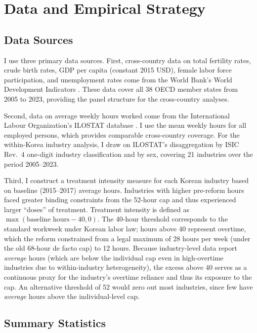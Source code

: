 \documentclass[12pt]{article}
\begin{document}
\section{Data and Empirical Strategy}

\subsection{Data Sources}

I use three primary data sources. First, cross-country data on total fertility rates, crude birth rates, GDP per capita (constant 2015 USD), female labor force participation, and unemployment rates come from the World Bank's World Development Indicators \citep{worldbank2024wdi}. These data cover all 38 OECD member states from 2005 to 2023, providing the panel structure for the cross-country analyses.

Second, data on average weekly hours worked come from the International Labour Organization's ILOSTAT database \citep{ilo2024ilostat}. I use the mean weekly hours for all employed persons, which provides comparable cross-country coverage. For the within-Korea industry analysis, I draw on ILOSTAT's disaggregation by ISIC Rev.~4 one-digit industry classification and by sex, covering 21 industries over the period 2005--2023.

Third, I construct a treatment intensity measure for each Korean industry based on baseline (2015--2017) average hours. Industries with higher pre-reform hours faced greater binding constraints from the 52-hour cap and thus experienced larger ``doses'' of treatment. Treatment intensity is defined as $\max(\text{baseline hours} - 40, 0)$. The 40-hour threshold corresponds to the standard workweek under Korean labor law; hours above 40 represent overtime, which the reform constrained from a legal maximum of 28 hours per week (under the old 68-hour de facto cap) to 12 hours. Because industry-level data report \textit{average} hours (which are below the individual cap even in high-overtime industries due to within-industry heterogeneity), the excess above 40 serves as a continuous proxy for the industry's overtime reliance and thus its exposure to the cap. An alternative threshold of 52 would zero out most industries, since few have \textit{average} hours above the individual-level cap.

\subsection{Summary Statistics}
\end{document}
